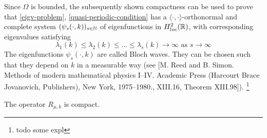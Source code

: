 	Since $\Omega$ is bounded, the subsequently shown compactness can be used to prove that \eqref{eigv-problem}, \eqref{quasi-periodic-condition} has a $\langle \cdot , \cdot \rangle$-orthonormal and complete system $(\psi_{s}(\cdot, k))_{s \in \mathbb{N}}$ of eigenfunctions in $H^{2}_{loc}(\mathbb{R})$, with corresponding eigenvalues satisfying	
	\[ \lambda_{1}(k) \leq \lambda_{2}(k) \leq \dotsc \leq \lambda_{s}(k) \rightarrow \infty \text{ as } s \rightarrow \infty \]
	The eigenfunctions $\psi_{s}(\cdot, k)$ are called Bloch waves. They can be chosen such that they depend on $k$ in a measurable way (see [M. Reed and B. Simon. Methods of modern mathematical physics I–IV. Academic Press (Harcourt Brace Jovanovich, Publishers), New York, 1975–1980., XIII.16, Theorem XIII.98]). \footnote{todo some expl} \\ %
	\begin{theorem}
		The operator $R_{\mu, k}$ is compact.
	\end{theorem}
